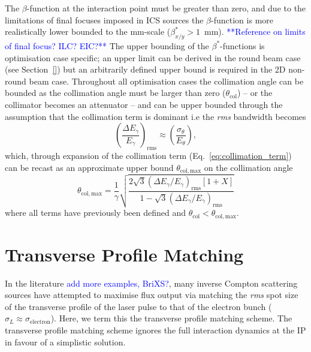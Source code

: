 \documentclass[../main.tex]{subfiles}
\begin{document}
The $\beta$-function at the interaction point must be greater than zero, and due to the limitations of final focuses imposed in ICS sources the $\beta$-function is more realistically lower bounded to the \si{\milli\meter}-scale ($\beta_{x/y}^{*} > 1$~\si{\milli\meter}). \textcolor{blue}{**Reference on limits of final focus? ILC? EIC?**} The upper bounding of the $\beta^{*}$-functions is optimisation case specific; an upper limit can be derived in the round beam case (see Section~\ref{}) but an arbitrarily defined upper bound is required in the 2D non-round beam case. Throughout all optimisation cases the collimation angle can be bounded as the collimation angle must be larger than zero ($\theta_{\mathrm{col}}$) -- or the collimator becomes an attenuator -- and can be upper bounded through the assumption that the collimation term is dominant i.e the \textit{rms} bandwidth becomes
\begin{equation}
\left(\frac{\Delta E_{\gamma}}{E_{\gamma}}\right)_{\mathrm{rms}} \approx \left(\frac{\sigma_{\theta}}{E_{\theta}}\right),    
\label{eq:collimation_dominant}
\end{equation}
which, through expansion of the collimation term (Eq.~\ref{eq:collimation_term}) can be recast as an approximate upper bound $\theta_{\mathrm{col},\mathrm{max}}$ on the collimation angle 
\begin{equation}
\theta_{\mathrm{col},\mathrm{max}} = \frac{1}{\gamma}\sqrt{\frac{2\sqrt{3}\left(\Delta E_{\gamma}/E_{\gamma}\right)_{\mathrm{rms}}\left[1+X\right]}{1-\sqrt{3}\left(\Delta E_{\gamma}/E_{\gamma}\right)_{\mathrm{rms}}}}
\label{eq:collimation_angle_upper_bound}    
\end{equation}
where all terms have previously been defined and $\theta_{\mathrm{col}}<\theta_{\mathrm{col},\mathrm{max}}$.

\section{Transverse Profile Matching}
\label{sec:transverse_profile_matching}

In the literature \cite{akagi2016narrow,deitrick2018high,jacquet2015radiation} \textcolor{blue}{add more examples, BriXS?}, many inverse Compton scattering sources have attempted to maximise flux output via matching the \textit{rms} spot size of the transverse profile of the laser pulse to that of the electron bunch ($\sigma_{L}\approx\sigma_{\mathrm{electron}}$). Here, we term this the transverse profile matching scheme. The transverse profile matching scheme ignores the full interaction dynamics at the IP in favour of a simplistic solution. 
\end{document}
